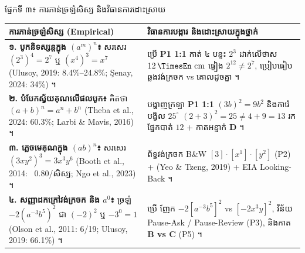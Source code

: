 \documentclass[a4paper,10pt]{article}
\renewcommand{\arraystretch}{1.14}
\newcommand{\en}[1]{{\TimesEn #1}}
\newcommand{\unit}[1]{\,\text{\en{#1}}}
\newcommand{\cnum}[1]{{\fontsize{10pt}{11.5pt}\selectfont\ding{\numexpr181+#1\relax}}}
\begin{document}
\begin{minipage}[t]{0.51\textwidth}
{\muol ផ្នែកទី ៣៖ ការភាន់ច្រឡំសិស្ស និងវិធានការដោះស្រាយ}\\[2pt]
{\fontsize{8.3pt}{11.8pt}\selectfont\renewcommand{\arraystretch}{1.08}%
\begin{tabular}{|L{3.50cm}|L{5.60cm}|}
\hline
{}
\textbf{ការភាន់ច្រឡំសិស្ស (\en{Empirical})} & \textbf{វិធានការបង្ការ និងដោះស្រាយក្នុងថ្នាក់} \\
\hline
\textbf{១. បូកនិទស្សន្តក្នុង $(a^m)^n$៖} សរសេរ $(2^3)^4=2^7$ ឬ $(x^4)^3=x^7$ (\en{Ulusoy, 2019}: 8.4\%–24.8\%; \en{Şenay, 2024}: 34\%) ។ & ប្រើ \textbf{\en{P1 1:1}} កាត់ ៤ បន្ទះ $2^3$ ដាក់លើថាស $12\unit{cm}$ ផ្ទៀង $2^{12}\neq 2^7$, ប្រៀបធៀបឆ្លងវង់ក្រចក \cnum{1} vs គោលដូចគ្នា \cnum{4} ។ \\
\hline
\textbf{២. បំបែកស្វ័យគុណលើផលបូក៖} គិតថា $(a+b)^n = a^n+b^n$ (\en{Theba et al., 2024}: 60.3\%; \en{Larbi \& Mavis, 2016}) ។ & បង្ហាញក្រឡា \textbf{\en{P1 1:1}} $(3b)^2=9b^2$ និងការ៉េបង្វិល $25^\circ$ $(2+3)^2=25 \neq 4+9=13$ រកផ្នែកបាត់ $12$ + កាតអន្ទាក់ \textbf{\en{D}} ។ \\
\hline
\textbf{៣. ភ្លេចមេគុណក្នុង $(ab)^n$៖} សរសេរ $(3xy^2)^3 = 3x^3y^6$ (\en{Booth et al., 2014}: ~0.80/សិស្ស; \en{Ngo et al., 2023}) ។ & ព័ទ្ធវង់ក្រចក \en{B\&W} $[3]\cdot[x^1]\cdot[y^2]$ (\en{P2}) + \en{[tracing]} (\en{Yeo \& Tzeng, 2019}) + \en{EIA Looking-Back} ។ \\
\hline
\textbf{៤. សញ្ញាដកក្រៅវង់ក្រចក និង $a^0$៖} ច្រឡំ $-2(a^{-3}b^5)^2$ ជា $(-2)^2$ ឬ $-3^0=1$ (\en{Olson et al., 2011}: 6/19; \en{Ulusoy, 2019}: 66.1\%) ។ & ប្រើ \cnum{5} ញែក $-2[a^{-3}b^5]^2$ vs $[-2x^3y]^2$, វិន័យ \en{Pause-Ask / Pause-Review} (\en{P3}), និងកាត \textbf{\en{B vs C}} (\en{P5}) ។ \\
\hline
\end{tabular}}
\end{minipage}
\end{document}
